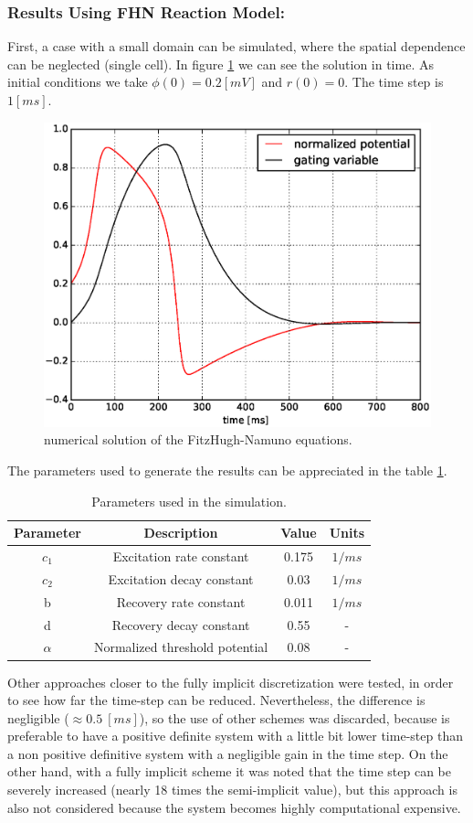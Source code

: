\subsubsection{Results Using FHN Reaction Model:}


First, a case with a small domain can be simulated, where the spatial dependence can be neglected (single cell). In figure \ref{fig:fhn_nofisiologico2} we can see the solution in time. As initial conditions we take $\phi(0) = 0.2 [mV]$ and $r(0) = 0$. The time step is $1 [ms]$. 

\begin{figure}[H]
\centering 
\includegraphics[height = 6 cm]{fig/Numerical_Experiments/ex1/EX1-FHN_single_cell.eps}
\caption{numerical solution of the FitzHugh-Namuno equations.}
\label{fig:fhn_nofisiologico2}
\end{figure}

The parameters used to generate the results can be appreciated in the table \ref{tab:parametros_FHN}.

\begin{table}[!htbp]
\centering
\caption{ Parameters used in the simulation.}
\label{tab:parametros_FHN}
\begin{tabular}{@{}cccc@{}}
\toprule
Parameter & Description                    & Value & Units  \\ \midrule
$c_1$     & Excitation rate constant       & 0.175 & $1/ms$ \\
$c_2$     & Excitation decay constant      & 0.03  & $1/ms$ \\
b         & Recovery rate constant         & 0.011 & $1/ms$ \\
d         & Recovery decay constant        & 0.55  & -      \\
$\alpha$  & Normalized threshold potential & 0.08  & -      \\ \bottomrule
\end{tabular}
\end{table}
Other approaches closer to the fully implicit discretization were tested, in order to see how far the time-step can be reduced. Nevertheless, the difference is negligible ($\approx 0.5 ~[ms]$), so the use of other schemes was discarded, because is preferable to have a positive definite system with a little bit lower time-step than a non positive definitive system with a negligible gain in the time step. On the other hand, with a fully implicit scheme it was noted that the time step can be severely increased (nearly 18 times the semi-implicit value), but this approach is also not considered because the system becomes highly computational expensive.

